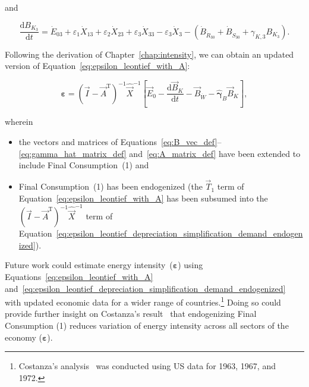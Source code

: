 \noindent{}and

\begin{equation} \label{eq:C-Total_Energy_Sec_3-unfinished}
	\frac{\mathrm{d}B_{K_{3}}}{\mathrm{d}t}
	= \dot{E}_{03}
	+ \varepsilon_{1} \dot{X}_{13}
	+ \varepsilon_{2} \dot{X}_{23}
	+ \varepsilon_{3} \dot{X}_{33}
	- \varepsilon_{3} \dot{X}_{3}
	- \left( \dot{B}_{\dot{R}_{30}} 
							+ \dot{B}_{\dot{S}_{30}}
							+ \gamma_{K,3} B_{K_{3}}
							\right).
\end{equation}

\noindent{}Following the derivation of Chapter~\ref{chap:intensity},
we can obtain an updated version 
of Equation~\ref{eq:epsilon_leontief_with_A}:

\begin{equation} \label{eq:epsilon_leontief_depreciation_simplification_demand_endogenized}
	\boldsymbol{\varepsilon} 
	= {(\vec{I} - \vec{A}^{\mathrm{T}})}^{-1}\hat{\vec{X}}^{-1}
		\left[\vec{E}_{0} 
				- \frac{\mathrm{d}\vec{B}_{K}}{\mathrm{d}t} 
				- \vec{B}_{\dot{W}}
				- \hat{\boldsymbol{\gamma}}_{B}\vec{B}_{K}
		\right],
\end{equation}

\noindent{}wherein 

\begin{itemize}
	\item{the vectors and matrices of Equations~\ref{eq:B_vec_def}--\ref{eq:gamma_hat_matrix_def}
	and~\ref{eq:A_matrix_def} have been extended to include Final Consumption~(1) and}
	
	\item{Final Consumption~(1) has been endogenized
	(the $\vec{T}_{1}$ term of Equation~\ref{eq:epsilon_leontief_with_A}
	has been subsumed into the 
	${(\vec{I} - \vec{A}^{\mathrm{T}})}^{-1}\hat{\vec{X}}^{-1}$
	term of Equation~\ref{eq:epsilon_leontief_depreciation_simplification_demand_endogenized}).}
\end{itemize}

Future work could estimate energy intensity~($\boldsymbol{\varepsilon}$) 
using Equations~\ref{eq:epsilon_leontief_with_A}
and~\ref{eq:epsilon_leontief_depreciation_simplification_demand_endogenized}
with updated economic data for a wider range of countries.\footnote{Costanza's
analysis~\cite{Costanza:1980ww} was conducted using US data for 1963, 1967, and 1972.}
Doing so could provide further insight on Costanza's result~\cite{Costanza:1980ww}
that endogenizing Final Consumption (1) reduces variation 
of energy intensity across all sectors of the economy ($\boldsymbol{\varepsilon}$).


